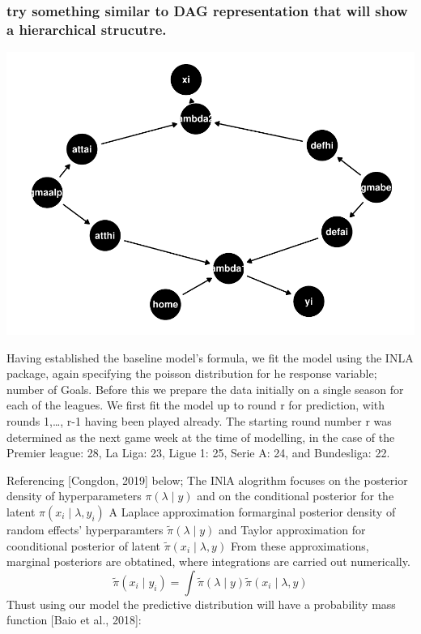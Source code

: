 \documentclass[
]{article}
\begin{document}
\hypertarget{try-something-similar-to-dag-representation-that-will-show-a-hierarchical-strucutre.}{%
\subsubsection{try something similar to DAG representation that will
show a hierarchical
strucutre.}\label{try-something-similar-to-dag-representation-that-will-show-a-hierarchical-strucutre.}}

\includegraphics{DissertationWriteUpV1_files/figure-latex/DAG-1.pdf}

Having established the baseline model's formula, we fit the model using
the INLA package, again specifying the poisson distribution for he
response variable; number of Goals. Before this we prepare the data
initially on a single season for each of the leagues. We first fit the
model up to round r for prediction, with rounds 1,\ldots, r-1 having
been played already. The starting round number r was determined as the
next game week at the time of modelling, in the case of the Premier
league: 28, La Liga: 23, Ligue 1: 25, Serie A: 24, and Bundesliga: 22.

Referencing {[}Congdon, 2019{]} below; The INlA alogrithm focuses on the
posterior density of hyperparameters \(\pi( \lambda \mid y)\) and on the
conditional posterior for the latent \(\pi(x_i \mid \lambda , y_i)\) A
Laplace approximation formarginal posterior density of random effects'
hyperparamters \(\tilde{\pi}(\lambda \mid y)\) and Taylor approximation
for coonditional posterior of latent
\(\tilde{\pi}(x_i \mid \lambda , y)\) From these approximations,
marginal posteriors are obtatined, where integrations are carried out
numerically.
\[\tilde{\pi}(x_i \mid y_i) = \int \tilde{\pi}(\lambda \mid y)  \tilde{\pi}(x_i \mid \lambda , y)\]
Thust using our model the predictive distribution will have a
probability mass function {[}Baio et al., 2018{]}:
\end{document}
